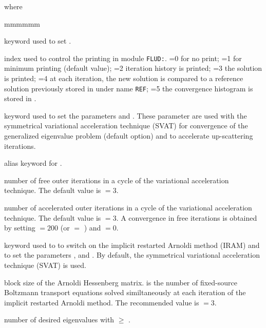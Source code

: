 \noindent where
\begin{ListeDeDescription}{mmmmmm}

\item[\moc{EDIT}] keyword used to set .

\item[\dusa{iprint}] index used to control the printing  in module {\tt FLUD:}.
=0 for no print; =1 for minimum printing (default value); =2 iteration history
is printed; =3 the solution is printed; =4 at each iteration, the new solution
is compared to a reference solution previously stored in  under
name {\tt REF}; =5 the convergence histogram is stored in .

\item[\moc{VAR1}] keyword used to set the parameters  and . These parameter are used with the symmetrical variational acceleration technique (SVAT) for convergence of the generalized eigenvalue problem (default option) and to accelerate up-scattering iterations.

\item[\moc{ACCE}] alias keyword for .

\item[\dusa{icl1}] number of free outer iterations in a cycle of the variational acceleration technique.
The default value is  $=3$.

\item[\dusa{icl2}] number of accelerated outer iterations  in a cycle of the
variational acceleration technique. The default value is  $=3$. A convergence in free iterations is
obtained by setting  $=200$ (or  $=$ ) and  $=0$.

\item[\moc{IRAM}] keyword used to to switch on the implicit restarted Arnoldi method (IRAM) and to
set the parameters ,  and .\cite{iram} By default, the symmetrical variational acceleration technique (SVAT) is used.

\item[\dusa{blsz}] block size of the Arnoldi Hessenberg matrix.  is the number of fixed-source Boltzmann transport
equations solved similtaneously at each iteration of the implicit restarted Arnoldi method. The recommended value is  $=3$.

\item[\dusa{korg}] number of desired eigenvalues with  $\ge$ .


\end{ListeDeDescription}
